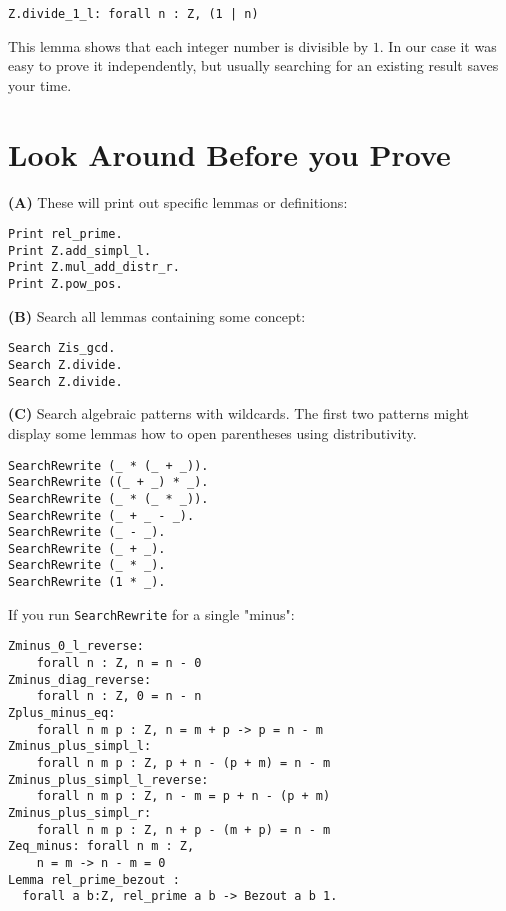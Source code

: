\documentclass[jou]{apa6}
\begin{document}
\begin{verbatim}
Z.divide_1_l: forall n : Z, (1 | n)
\end{verbatim}

This lemma shows that each integer number is divisible by $1$. 
In our case it was easy to prove it independently, but usually 
searching for an existing result saves your time.


\section{Look Around Before you Prove}

{\bf (A)} These will print out specific lemmas or definitions:

\begin{verbatim}
Print rel_prime.
Print Z.add_simpl_l.
Print Z.mul_add_distr_r.
Print Z.pow_pos.
\end{verbatim}

\vspace{6pt}
{\bf (B)} Search all lemmas containing some concept:

\begin{verbatim}
Search Zis_gcd.
Search Z.divide.
Search Z.divide.
\end{verbatim}

\vspace{6pt}
{\bf (C)} Search algebraic patterns with wildcards. 
The first two patterns might display some lemmas how to 
open parentheses using distributivity.

\begin{verbatim}
SearchRewrite (_ * (_ + _)).
SearchRewrite ((_ + _) * _).
SearchRewrite (_ * (_ * _)).
SearchRewrite (_ + _ - _).
SearchRewrite (_ - _).
SearchRewrite (_ + _).
SearchRewrite (_ * _).
SearchRewrite (1 * _).
\end{verbatim}

If you run {\tt SearchRewrite} for a single "minus": 

\begin{verbatim}
Zminus_0_l_reverse: 
    forall n : Z, n = n - 0
Zminus_diag_reverse: 
    forall n : Z, 0 = n - n
Zplus_minus_eq: 
    forall n m p : Z, n = m + p -> p = n - m
Zminus_plus_simpl_l: 
    forall n m p : Z, p + n - (p + m) = n - m
Zminus_plus_simpl_l_reverse: 
    forall n m p : Z, n - m = p + n - (p + m)
Zminus_plus_simpl_r: 
    forall n m p : Z, n + p - (m + p) = n - m
Zeq_minus: forall n m : Z, 
    n = m -> n - m = 0
Lemma rel_prime_bezout : 
  forall a b:Z, rel_prime a b -> Bezout a b 1.
\end{verbatim}
\end{document}
